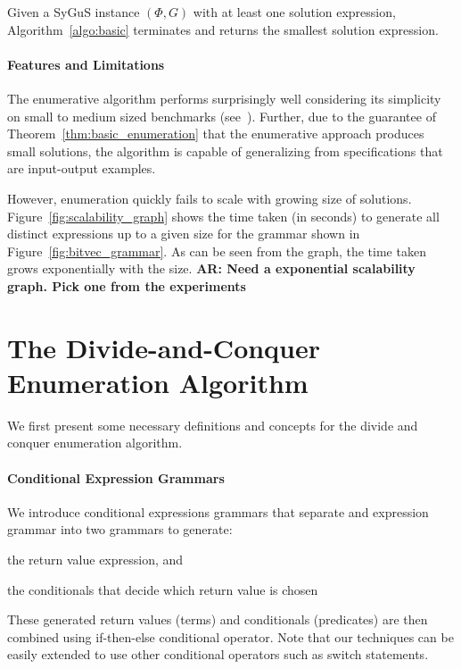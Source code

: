 \documentclass{llncs}
\newcommand\arsays[1]{{\bf AR: #1}}
\newcommand\Spec{\Phi}
\newcommand\Grammar{G}
\begin{document}
\begin{theorem}
  \label{thm:basic_enumeration}
  Given a SyGuS instance $(\Spec, \Grammar)$ with at least one solution
  expression, Algorithm~\ref{algo:basic} terminates and returns the
  smallest solution expression.
\end{theorem}

\paragraph{Features and Limitations}
The enumerative algorithm performs surprisingly well considering its
simplicity on small to medium sized benchmarks
(see~\cite{Transit,sygus_reports,etc}).
Further, due to the guarantee of Theorem~\ref{thm:basic_enumeration}
that the enumerative approach produces small solutions, the algorithm is
capable of generalizing from specifications that are input-output
examples.

However, enumeration quickly fails to scale with growing size of
solutions.
Figure~\ref{fig:scalability_graph} shows the time taken (in seconds) to
generate all distinct expressions up to a given size for the grammar
shown in Figure~\ref{fig:bitvec_grammar}.
As can be seen from the graph, the time taken grows exponentially with
the size.
\arsays{Need a exponential scalability graph. Pick one from the
experiments}



\section{The Divide-and-Conquer Enumeration Algorithm}
\label{sec:algo}

We first present some necessary definitions and concepts for the divide
and conquer enumeration algorithm.

\paragraph{Conditional Expression Grammars}
We introduce conditional expressions grammars that separate and
expression grammar into two grammars to generate:
\begin{inparaenum}[(a)]
\item the return value expression, and 
\item the conditionals that decide which return value is chosen
\end{inparaenum}
These generated return values (terms) and conditionals (predicates) are
then combined using if-then-else conditional operator.
Note that our techniques can be easily extended to use other conditional
operators such as switch statements.
\end{document}
